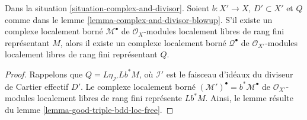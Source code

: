 \begin{lemma}
\label{lemma-complex-and-divisor-blowup-T-represented-bdd-loc-free}
Dans la situation \ref{situation-complex-and-divisor}. Soient $b : X' \to X$,
$D' \subset X'$ et $Q$ comme dans le
lemme \ref{lemma-complex-and-divisor-blowup}.
S'il existe un complexe localement borné $\mathcal{M}^\bullet$
de $\mathcal{O}_X$-modules localement libres de rang fini représentant $M$,
alors il existe un complexe localement borné $\mathcal{Q}^\bullet$
de $\mathcal{O}_{X'}$-modules localement libres de rang fini représentant $Q$.
\end{lemma}

\begin{proof}
Rappelons que $Q = L\eta_{\mathcal{I}'}Lb^*M$, où $\mathcal{I}'$ est le
faisceau d'idéaux du diviseur de Cartier effectif $D'$.
Le complexe localement borné
$(\mathcal{M}')^\bullet = b^*\mathcal{M}^\bullet$ de
$\mathcal{O}_{X'}$-modules localement libres de rang fini
représente $Lb^*M$. Ainsi, le lemme résulte du
lemme \ref{lemma-good-triple-bdd-loc-free}.
\end{proof}

